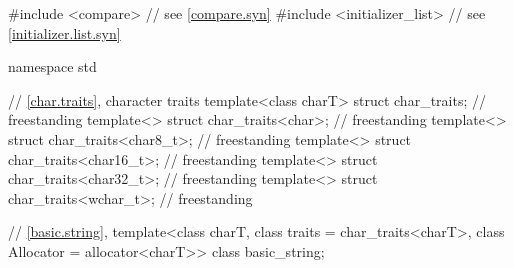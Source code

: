 \begin{codeblock}
#include <compare>              // see \ref{compare.syn}
#include <initializer_list>     // see \ref{initializer.list.syn}

namespace std {
  // \ref{char.traits}, character traits
  template<class charT> struct char_traits;                             // freestanding
  template<> struct char_traits<char>;                                  // freestanding
  template<> struct char_traits<char8_t>;                               // freestanding
  template<> struct char_traits<char16_t>;                              // freestanding
  template<> struct char_traits<char32_t>;                              // freestanding
  template<> struct char_traits<wchar_t>;                               // freestanding

  // \ref{basic.string}, 
  template<class charT, class traits = char_traits<charT>, class Allocator = allocator<charT>>
    class basic_string;

}
\end{codeblock}

